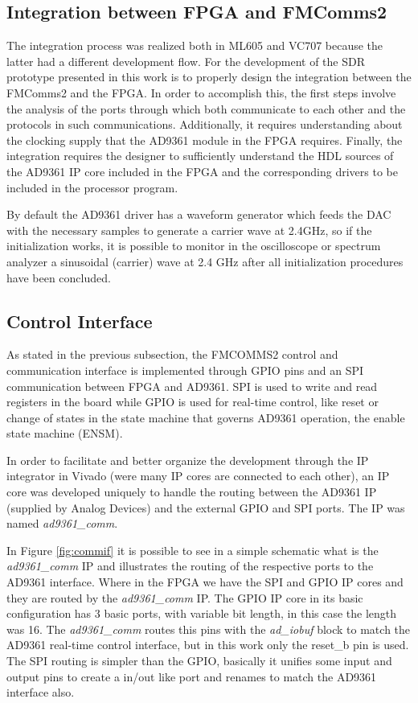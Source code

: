\subsection{Integration between FPGA and FMComms2}

The integration process was realized both in ML605 and VC707 because the latter
had a different development flow. For the development of the SDR prototype
presented in this work is to properly design the integration between the
FMComms2 and the FPGA. In order to accomplish this, the first steps involve the
analysis of the ports through which both communicate to each other and the
protocols in such communications. Additionally, it requires understanding about
the clocking supply that the AD9361 module in the FPGA requires. Finally, the
integration requires the designer to sufficiently understand the HDL sources of
the AD9361 IP core included in the FPGA and the corresponding drivers to be
included in the processor program.

By default the AD9361 driver has a waveform generator which feeds the DAC with
the necessary samples to generate a carrier wave at 2.4GHz, so if the
initialization works, it is possible to monitor in the oscilloscope or spectrum
analyzer a sinusoidal (carrier) wave at 2.4 GHz after all initialization
procedures have been concluded.

\subsection{Control Interface}
\label{subs:controlif}

As stated in the previous subsection, the FMCOMMS2 control and communication
interface is implemented through GPIO pins and an SPI communication between FPGA
and AD9361. SPI is used to write and read registers in the board while GPIO is
used for real-time control, like reset or change of states in the state machine
that governs AD9361 operation, the enable state machine (ENSM).

In order to facilitate and better organize the development through the IP
integrator in Vivado (were many IP cores are connected to each other), an IP
core was developed uniquely to handle the routing between the AD9361 IP
(supplied by Analog Devices) and the external GPIO and SPI ports. The IP was
named \emph{ad9361\_comm}.

In Figure \ref{fig:commif} it is possible to see in a simple schematic what is
the \emph{ad9361\_comm} IP and illustrates the routing of the respective ports
to the AD9361 interface. Where in the FPGA we have the SPI and GPIO IP cores
and they are routed by the \emph{ad9361\_comm} IP. The GPIO IP core in its
basic configuration has 3 basic ports, with variable bit length,  in this case
the length was 16. The \emph{ad9361\_comm} routes this pins with the
\emph{ad\_iobuf} block to match the AD9361 real-time control interface, but in
this work only the reset\_b pin is used. The SPI routing is simpler than the
GPIO, basically it unifies some input and output pins to create a in/out like
port and renames to match the AD9361 interface also.


